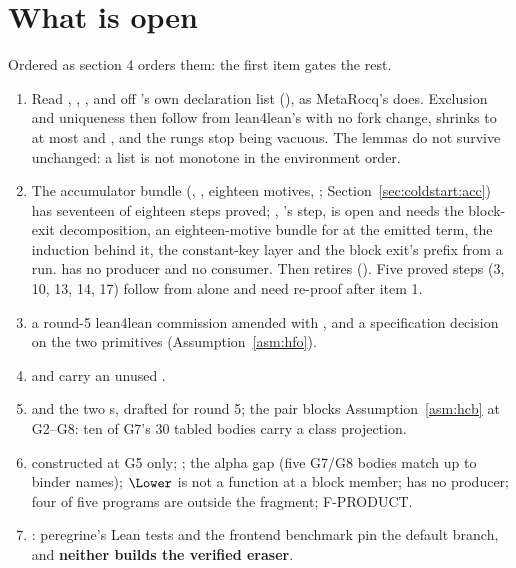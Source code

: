 \section{What is open}
\label{sec:trust:open}

Ordered as  section 4 orders them: the first item gates the rest.

\begin{enumerate}
\item {} \stOpen{} Read , ,
,  and  off 's own declaration
list (), as MetaRocq's  does. Exclusion and uniqueness then
follow from lean4lean's  with no fork change,  shrinks
to at most  and , and the rungs stop being vacuous. The
 lemmas do not survive unchanged: a list is not monotone in the environment order.
\item {} \stOpen{} The accumulator bundle (, ,
eighteen motives, ; Section~\ref{sec:coldstart:acc}) has seventeen of eighteen steps proved; ,
's step, is open and needs the block-exit decomposition, an eighteen-motive
bundle for  at the emitted term, the  induction behind it, the
constant-key  layer and the block exit's prefix from a run.
 has no producer and  no consumer. Then
 retires  ().
Five proved steps (3, 10, 13, 14, 17) follow from  alone and need
re-proof after item 1.
\item {} a round-5 lean4lean commission amended with ,
and a specification decision on the two  primitives (Assumption~\ref{asm:hfo}).
\item {}  and 
carry an unused .
\item {} and the two  s, drafted for round 5;
the  pair blocks Assumption~\ref{asm:hcb} at G2--G8: ten of G7's 30 tabled bodies
carry a class projection.
\item {}  constructed at G5 only; ; the alpha
gap (five G7/G8 bodies match up to binder names); $\Lower$ is not a function at a block member;
 has no producer; four of five programs are outside the fragment; F-PRODUCT.
\item {}: peregrine's Lean tests and the frontend benchmark pin the default branch,
and \textbf{neither builds the verified eraser}.
\end{enumerate}

